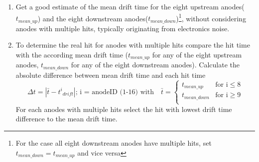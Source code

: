 \begin{enumerate}
\itemsep0em
\item Get a good estimate of the mean drift time for the eight upstream anodes($t_{mean\_up}$) and the eight downstream anodes($t_{mean\_down}$)\footnote{For the case all eight downstream anodes have multiple hits, set $t_{mean\_down} = t_{mean\_up}$ and vice versa}, without considering anodes with multiple hits, typically originating from electronics noise.
\item To determine the real hit for anodes with multiple hits compare the hit time with the according mean drift time ($t_{mean\_up}$ for any of the eight upstream anodes, $t_{mean\_down}$ for any of the eight downstream anodes). Calculate the absolute difference between mean drift time and each hit time
\begin{equation}
\Delta t = | \bar{t} - {t^i}_{drift}|; \, \text{i = anodeID (1-16) with} \quad \bar{t} = 
\begin{cases}
t_{mean\_up} & \text{for i} \leq 8\\
t_{mean\_down} & \text{for i} \geq 9 \\
\end{cases}
\end{equation}
For each anodes with multiple hits select the hit with lowest drift time difference to the mean drift time.
\end{enumerate}

